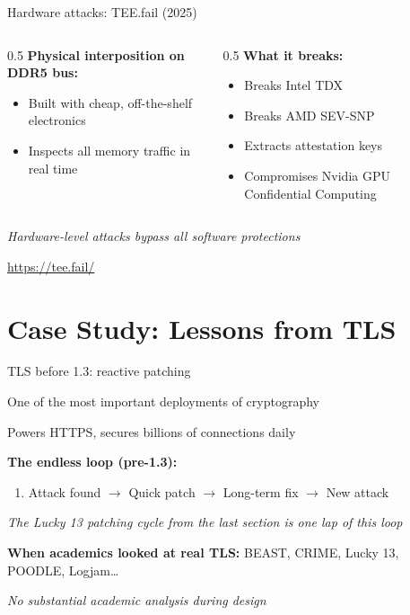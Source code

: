 \ifdefined\PRESENTATION\else\PassOptionsToClass{handout}{beamer}\fi\documentclass[aspectratio=169, lualatex]{beamer}
\begin{document}
\begin{frame}{Hardware attacks: TEE.fail (2025)}
	\begin{columns}[c]
		\begin{column}{0.5\textwidth}
			\textbf{Physical interposition on DDR5 bus:}
			\begin{itemize}
				\item Built with cheap, off-the-shelf electronics
				\item Inspects all memory traffic in real time
			\end{itemize}
		\end{column}
		\begin{column}{0.5\textwidth}
			\textbf{What it breaks:}
			\begin{itemize}
				\item Breaks Intel TDX
				\item Breaks AMD SEV-SNP
				\item Extracts attestation keys
				\item Compromises Nvidia GPU Confidential Computing
			\end{itemize}
		\end{column}
	\end{columns}
	\vspace{0.5em}
	\begin{center}
		\textit{Hardware-level attacks bypass all software protections}

		\vspace{0.3em}

		\url{https://tee.fail/}
	\end{center}
\end{frame}

\section{Case Study: Lessons from TLS}

\begin{frame}{TLS before 1.3: reactive patching}
	\begin{center}
		\Large
		One of the most important deployments of cryptography

		\normalsize
		Powers HTTPS, secures billions of connections daily
	\end{center}
	\vspace{0.5em}
	\textbf{The endless loop (pre-1.3):}
	\begin{enumerate}
		\item Attack found $\rightarrow$ Quick patch $\rightarrow$ Long-term fix $\rightarrow$ New attack
	\end{enumerate}
	\vspace{0.2em}
	\textit{The Lucky 13 patching cycle from the last section is one lap of this loop}

	\vspace{0.3em}
	\textbf{When academics looked at real TLS:} BEAST, CRIME, Lucky 13, POODLE, Logjam\ldots
	\vspace{0.3em}
	\begin{center}
		\textit{No substantial academic analysis during design}
	\end{center}
\end{frame}
\end{document}
